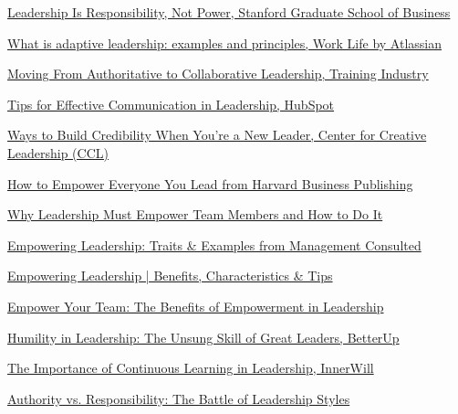 \documentclass[runningheads]{llncs}
\begin{document}
\begin{thebibliography}{10}
\href{https://www.gsb.stanford.edu/insights/leadership-responsibility-not-power}{Leadership Is Responsibility, Not Power, Stanford Graduate School of Business}

\href{https://www.atlassian.com/blog/leadership/adaptive-leadership}{What is adaptive leadership: examples and principles, Work Life by Atlassian}

\href{https://trainingindustry.com/articles/leadership/moving-from-authoritative-to-collaborative-leadership-benefits-and-best-practices-to-consider/#:~:text=1}{Moving From Authoritative to Collaborative Leadership, Training Industry}

\href{https://blog.hubspot.com/marketing/build-credibility-new-leader}{Tips for Effective Communication in Leadership, HubSpot}

\href{https://www.ccl.org/articles/leading-effectively-articles/communication-1-idea-3-facts-5-tips/}{Ways to Build Credibility When You're a New Leader, Center for Creative Leadership (CCL)}

\href{https://www.harvardbusiness.org/whoever-they-are-wherever-they-are-empowering-everyone-you-lead/#:~:text=The%20best%20leaders%20make%20the,getting%20to%20know%20your%20people}{How to Empower Everyone You Lead from Harvard Business Publishing}

\href{https://johnmattone.com/blog/why-leadership-must-empower-team-members-and-how-to-do-it/#:~:text=Empowering%20team%20members%20leads%20to,action%20of%20the%20empowered%20team}{Why Leadership Must Empower Team Members and How to Do It}

\href{https://managementconsulted.com/empowering-leadership/#:~:text=Here%20are%20some%20empowering%20leadership,They%20are%20effective%20communicators}{Empowering Leadership: Traits \& Examples from Management Consulted}

\href{https://www.leapsome.com/blog/empowering-leadership#:~:text=Empowering%20leadership%20is%20the%20practice,fits%20into%20the%20big%20picture}{Empowering Leadership | Benefits, Characteristics \& Tips}

\href{https://maven.com/articles/empowerment-in-leadership#:~:text=1,2}{Empower Your Team: The Benefits of Empowerment in Leadership}

\href{https://www.betterup.com/blog/humility-in-leadership}{Humility in Leadership: The Unsung Skill of Great Leaders, BetterUp}

\href{https://innerwill.org/continuous-learning-in-leadership/#:~:text=Our%20clients%20compete%20in%20various,very%20much%20their%20competitive%20advantage}{The Importance of Continuous Learning in Leadership, InnerWill}


\href{https://joshuamevans.com/authority-vs-responsibility-the-battle-of-leadership-styles/}{Authority vs. Responsibility: The Battle of Leadership Styles}


\end{thebibliography}
\end{document}
